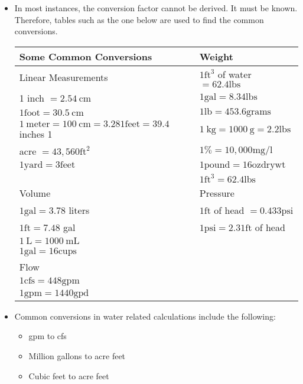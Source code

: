 \begin{itemize}
\item In most instances, the conversion factor cannot be derived. It must be known. Therefore, tables such as the one below are used to find the common conversions.\\
\begin{tabular}{|l|l|}
\hline
Some Common Conversions & Weight \\
\hline
Linear Measurements & $1 \mathrm{ft}^{3}$ of water $=62.4 \mathrm{lbs}$ \\
\hline
1 inch $=2.54 \mathrm{~cm}$ & $1 \mathrm{gal}=8.34 \mathrm{lbs}$ \\
$1 \mathrm{foot}=30.5 \mathrm{~cm}$ & $1 \mathrm{lb}=453.6 \mathrm{grams}$ \\
$1 \mathrm{~meter}=100 \mathrm{~cm}=3.281 \mathrm{feet}=39.4$ inches 1 & $1 \mathrm{~kg}=1000 \mathrm{~g}=2.2 \mathrm{lbs}$ \\
acre $=43,560 \mathrm{ft}^{2}$ & $1 \%=10,000 \mathrm{mg} / \mathrm{l}$ \\
$1 \mathrm{yard}=3 \mathrm{feet}$ & $1 \mathrm{pound}=16 \mathrm{oz} \mathrm{dry} \mathrm{wt}$ \\
 & $1 \mathrm{ft}^{3}=62.4 \mathrm{lbs}$ \\
\hline
Volume & Pressure \\
\hline
$1 \mathrm{gal}=3.78$ liters & $1 \mathrm{ft}$ of head $=0.433 \mathrm{psi}$ \\
$1 \mathrm{ft}=7.48$ gal & $1 \mathrm{psi}=2.31 \mathrm{ft}$ of head \\
$1 \mathrm{~L}=1000 \mathrm{~mL}$ &  \\
$1 \mathrm{gal}=16 \mathrm{cups}$ &  \\
\hline
Flow &  \\
\hline
$1 \mathrm{cfs}=448 \mathrm{gpm}$ &  \\
$1 \mathrm{gpm}=1440 \mathrm{gpd}$ &  \\
\hline
\end{tabular}
\vspace{0.2cm}
\item Common conversions in water related calculations include the following:

\begin{itemize}
  \item gpm to cfs

  \item Million gallons to acre feet

  \item Cubic feet to acre feet


\end{itemize}
\end{itemize}
